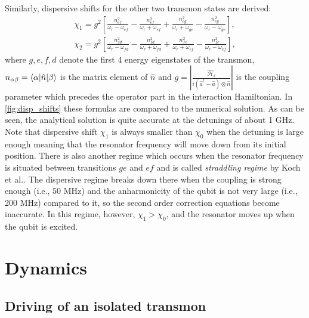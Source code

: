 \documentclass[12pt, twoside]{report}
\DeclarePairedDelimiter\bra{\langle}{\rvert}
\DeclarePairedDelimiter\ket{\lvert}{\rangle}
\newcommand{\sbrkt}[1]{\left[ #1 \right]}
\numberwithin{equation}{section}
\begin{document}
Similarly, dispersive shifts for the other two transmon states are derived:
\begin{gather}
\chi_1 = g^2\sbrkt{\frac{n_{ef}^2}{\omega_r - \omega_{ef}} - \frac{n_{ef}^2}{\omega_r + \omega_{ef}} + \frac{n_{eg}^2}{\omega_r + \omega_{ge}}-\frac{n_{eg}^2}{\omega_r - \omega_{ge} }},\label{eq:chi1}
\\
\chi_2 = g^2\sbrkt{\frac{n_{fd}^2}{\omega_r - \omega_{fd}} -\frac{n_{fd}^2}{\omega_r + \omega_{fd}} + \frac{n_{fe}^2}{\omega_r + \omega_{ef}}- \frac{n_{fe}^2}{\omega_r -\omega_{ef}}},
\label{eq:chi2}
\end{gather}
where $g, e, f, d$ denote the first 4 energy eigenstates of the transmon, $n_{\alpha\beta} = \bra{\alpha} \hat n \ket{\beta}$ is the matrix element of $\hat n$ and $g = \left.|\frac{\mathcal{\hat H}_i}{i(\hat a^\dag  - \hat a)\otimes \hat n}|\right.$ is the coupling parameter which precedes the operator part in the interaction Hamiltonian. In \autoref{fig:disp_shifts} these formulas are compared to the numerical solution. As can be seen, the analytical solution is quite accurate at the detunings of about 1 GHz. Note that dispersive shift $\chi_1$ is always smaller than $\chi_0$ when the detuning is large enough meaning that the resonator frequency will move down from its initial position. There is also another regime which occurs when the resonator frequency is situated between transitions $ge$ and $ef$ and is called \textit{straddling regime} by Koch et al.\cite{Koch2007}. The dispersive regime breaks down there when the coupling is strong enough (i.e., 50 MHz) and the anharmonicity of the qubit is not very large (i.e., 200 MHz) compared to it, so the second order correction equations become inaccurate. In this regime, however, $\chi_1>\chi_0$, and the resonator moves up when the qubit is excited.


\section{Dynamics}\label{sec:dynamics}

\subsection{Driving of an isolated transmon}
\end{document}
